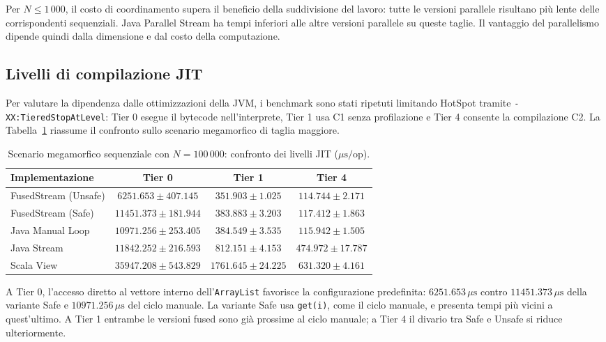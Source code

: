 \documentclass[a4paper,11pt]{report}
\theoremstyle{definition}
\begin{document}
Per $N \le 1\,000$, il costo di coordinamento supera il beneficio della suddivisione del lavoro: tutte le versioni parallele risultano più lente delle corrispondenti sequenziali. Java Parallel Stream ha tempi inferiori alle altre versioni parallele su queste taglie. Il vantaggio del parallelismo dipende quindi dalla dimensione e dal costo della computazione.

\subsection{Livelli di compilazione JIT}
\label{subsec:bench-jit-levels}

Per valutare la dipendenza dalle ottimizzazioni della JVM, i benchmark sono stati ripetuti limitando HotSpot tramite \texttt{-XX:TieredStopAtLevel}: Tier 0 esegue il bytecode nell'interprete, Tier 1 usa C1 senza profilazione e Tier 4 consente la compilazione C2. La Tabella~\ref{tab:bench_tiers} riassume il confronto sullo scenario megamorfico di taglia maggiore.

\begin{table}[htbp]
  \centering
  \caption{Scenario megamorfico sequenziale con $N = 100\,000$: confronto dei livelli JIT ($\mu\text{s}/\text{op}$).}
  \label{tab:bench_tiers}
  \vspace{2mm}
  \small
  \setlength{\tabcolsep}{4pt}
  \begin{tabular}{lccc}
    \toprule
    \textbf{Implementazione}      & \textbf{Tier 0}         & \textbf{Tier 1}       & \textbf{Tier 4}      \\
    \midrule
    \textsf{FusedStream (Unsafe)} & $6251.653 \pm 407.145$  & $351.903 \pm 1.025$   & $114.744 \pm 2.171$  \\
    \textsf{FusedStream (Safe)}   & $11451.373 \pm 181.944$ & $383.883 \pm 3.203$   & $117.412 \pm 1.863$  \\
    \textsf{Java Manual Loop}     & $10971.256 \pm 253.405$ & $384.549 \pm 3.535$   & $115.942 \pm 1.505$  \\
    \textsf{Java Stream}          & $11842.252 \pm 216.593$ & $812.151 \pm 4.153$   & $474.972 \pm 17.787$ \\
    \textsf{Scala View}           & $35947.208 \pm 543.829$ & $1761.645 \pm 24.225$ & $631.320 \pm 4.161$  \\
    \bottomrule
  \end{tabular}
\end{table}

A Tier 0, l'accesso diretto al vettore interno dell'\texttt{ArrayList} favorisce la configurazione predefinita: $6251.653\,\mu\text{s}$ contro $11451.373\,\mu\text{s}$ della variante Safe e $10971.256\,\mu\text{s}$ del ciclo manuale. La variante Safe usa \texttt{get(i)}, come il ciclo manuale, e presenta tempi più vicini a quest'ultimo. A Tier 1 entrambe le versioni fused sono già prossime al ciclo manuale; a Tier 4 il divario tra Safe e Unsafe si riduce ulteriormente.
\end{document}
